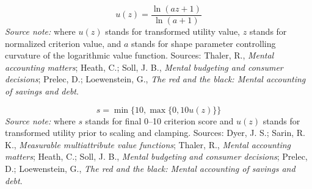 \documentclass[12pt]{article}
\begin{document}
\begin{equation}
\label{eq:vf_log}
u(z) = \frac{\ln(az+1)}{\ln(a+1)}
\end{equation}
\noindent\textit{Source note:} where $u(z)$ stands for transformed utility value, $z$ stands for normalized criterion value, and $a$ stands for shape parameter controlling curvature of the logarithmic value function. Sources: Thaler, R., \emph{Mental accounting matters}; Heath, C.; Soll, J. B., \emph{Mental budgeting and consumer decisions}; Prelec, D.; Loewenstein, G., \emph{The red and the black: Mental accounting of savings and debt}.

\begin{equation}
\label{eq:vf_score_scale}
s = \min\{10,\max\{0,10u(z)\}\}
\end{equation}
\noindent\textit{Source note:} where $s$ stands for final 0--10 criterion score and $u(z)$ stands for transformed utility prior to scaling and clamping. Sources: Dyer, J. S.; Sarin, R. K., \emph{Measurable multiattribute value functions}; Thaler, R., \emph{Mental accounting matters}; Heath, C.; Soll, J. B., \emph{Mental budgeting and consumer decisions}; Prelec, D.; Loewenstein, G., \emph{The red and the black: Mental accounting of savings and debt}.
\end{document}
